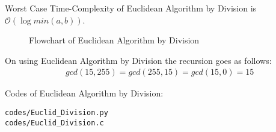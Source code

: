 \documentclass[journal,12pt,twocolumn]{IEEEtran}
\begin{document}
\quad Worst Case Time-Complexity of Euclidean Algorithm by Division is $\mathcal{O}(\log min(a,b))$.\\

\begin{figure}[h!]
	\begin{center}
		\resizebox{\columnwidth/1}{!}{}
	\end{center}
	\caption{Flowchart of Euclidean Algorithm by Division}
	\label{fig:Input}
\end{figure}

\quad On using Euclidean Algorithm by Division the recursion goes as follows:
\[
\begin{split}
&gcd(15,255) = gcd(255,15) = gcd(15,0) = 15
\end{split}\]

Codes of Euclidean Algorithm by Division:
\begin{lstlisting}
codes/Euclid_Division.py
codes/Euclid_Division.c
\end{lstlisting}
\end{document}
